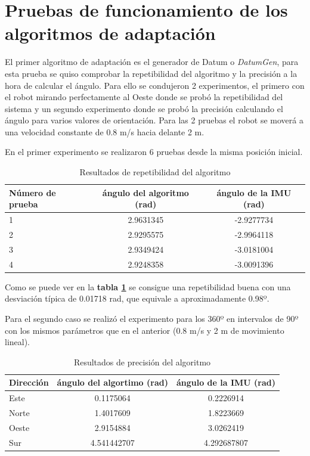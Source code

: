 \section{Pruebas de funcionamiento de los algoritmos de adaptación}
El primer algoritmo de adaptación es el generador de Datum o \textit{DatumGen}, para esta prueba se quiso comprobar la repetibilidad del algoritmo y 
la precisión a la hora de calcular el ángulo. Para ello se condujeron 2 experimentos, el primero con el robot mirando perfectamente al Oeste donde se probó la 
repetibilidad del sistema y un segundo experimento donde se probó la precisión calculando el ángulo para varios valores de orientación. Para las 2 pruebas 
el robot se moverá a una velocidad constante de 0.8 m/s hacia delante 2 m.

En el primer experimento se realizaron 6 pruebas desde la misma posición inicial.
\begin{table}[H]
    \centering
    \caption{Resultados de repetibilidad del algoritmo}
    \begin{tabular}{|l|c|c|}
        \hline
        Número de prueba     & ángulo del algoritmo (rad) & ángulo de la IMU (rad)     \\ \hline
        1           & 2.9631345 & -2.9277734 \\ \hline
        2           & 2.9295575 & -2.9964118  \\ \hline
        3           & 2.9349424 & -3.0181004  \\ \hline
        4           & 2.9248358 & -3.0091396  \\ \hline
    \end{tabular}
    \label{tab:repetibilidad_datumgen}
\end{table}

Como se puede ver en la \textbf{tabla \ref{tab:repetibilidad_datumgen}} se consigue una repetibilidad buena con una desviación 
típica de 0.01718 rad, que equivale a aproximadamente 0.98º.

Para el segundo caso se realizó el experimento para los 360º en intervalos de 90º con los mismos parámetros que en el anterior (0.8 m/s y 2 m de movimiento lineal).

\begin{table}[H]
    \centering
    \caption{Resultados de precisión del algoritmo}
    \begin{tabular}{|l|c|c|}
        \hline
        Dirección     & ángulo del algortimo (rad) & ángulo de la IMU (rad)     \\ \hline
        Este           & 0.1175064 & 0.2226914 \\ \hline
        Norte           & 1.4017609 & 1.8223669  \\ \hline
        Oeste           & 2.9154884 & 3.0262419  \\ \hline
        Sur           & 4.541442707 & 4.292687807 \\ \hline
    \end{tabular}
    \label{tab:precisión_datumgen}
\end{table}


